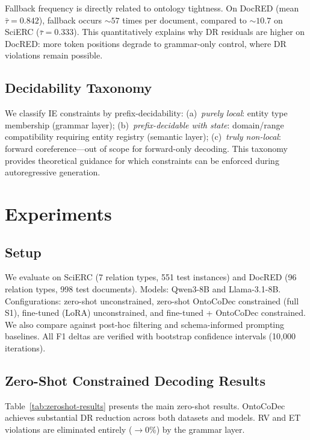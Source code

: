 \documentclass[11pt,a4paper]{article}
\newcommand{\sys}{OntoCoDec}
\begin{document}
Fallback frequency is directly related to ontology tightness.
On DocRED (mean $\bar{\tau}=0.842$), fallback occurs ${\sim}57$ times per document, compared to ${\sim}10.7$ on SciERC ($\bar{\tau}=0.333$).
This quantitatively explains why DR residuals are higher on DocRED: more token positions degrade to grammar-only control, where DR violations remain possible.

\subsection{Decidability Taxonomy}

We classify IE constraints by prefix-decidability:
(a)~\emph{purely local}: entity type membership (grammar layer);
(b)~\emph{prefix-decidable with state}: domain/range compatibility requiring entity registry (semantic layer);
(c)~\emph{truly non-local}: forward coreference---out of scope for forward-only decoding.
This taxonomy provides theoretical guidance for which constraints can be enforced during autoregressive generation.

\section{Experiments}
\label{sec:experiments}

\subsection{Setup}

We evaluate on SciERC \cite{luan2018multi} (7 relation types, 551 test instances) and DocRED \cite{yao2019docred} (96 relation types, 998 test documents).
Models: Qwen3-8B and Llama-3.1-8B.
Configurations: zero-shot unconstrained, zero-shot \sys{} constrained (full S1), fine-tuned (LoRA) unconstrained, and fine-tuned + \sys{} constrained.
We also compare against post-hoc filtering and schema-informed prompting baselines.
All F1 deltas are verified with bootstrap confidence intervals (10,000 iterations).

\subsection{Zero-Shot Constrained Decoding Results}

Table~\ref{tab:zeroshot-results} presents the main zero-shot results.
\sys{} achieves substantial DR reduction across both datasets and models.
RV and ET violations are eliminated entirely ($\rightarrow$0\%) by the grammar layer.
\end{document}
